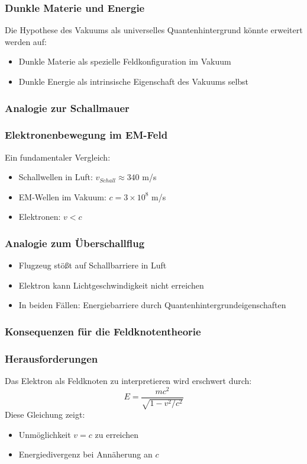 \documentclass[12pt,a4paper]{article}
\begin{document}
	\subsubsection{Dunkle Materie und Energie}
	Die Hypothese des Vakuums als universelles Quantenhintergrund könnte erweitert werden auf:
	\begin{itemize}
		\item Dunkle Materie als spezielle Feldkonfiguration im Vakuum
		\item Dunkle Energie als intrinsische Eigenschaft des Vakuums selbst
	\end{itemize}
	
	\subsubsection{Analogie zur Schallmauer}
	
	\subsubsection{Elektronenbewegung im EM-Feld}
	Ein fundamentaler Vergleich:
	\begin{itemize}
		\item Schallwellen in Luft: $v_{Schall} \approx 340$ m/s
		\item EM-Wellen im Vakuum: $c = 3 \times 10^8$ m/s
		\item Elektronen: $v < c$
	\end{itemize}
	
	\subsubsection{Analogie zum Überschallflug}
	\begin{itemize}
		\item Flugzeug stößt auf Schallbarriere in Luft
		\item Elektron kann Lichtgeschwindigkeit nicht erreichen
		\item In beiden Fällen: Energiebarriere durch Quantenhintergrundeigenschaften
	\end{itemize}
	
	\subsubsection{Konsequenzen für die Feldknotentheorie}
	
	\subsubsection{Herausforderungen}
	Das Elektron als Feldknoten zu interpretieren wird erschwert durch:
	\begin{equation}
		E = \frac{mc^2}{\sqrt{1-v^2/c^2}}
	\end{equation}
	Diese Gleichung zeigt:
	\begin{itemize}
		\item Unmöglichkeit $v = c$ zu erreichen
		\item Energiedivergenz bei Annäherung an $c$
	\end{itemize}
	
\end{document}
